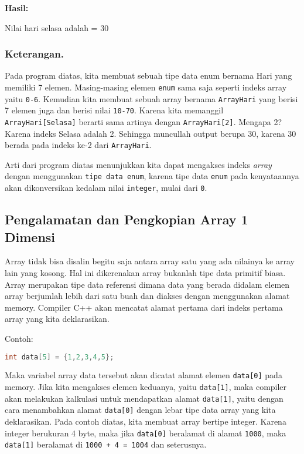 \textbf{Hasil:}

\begin{lcverbatim}
Nilai hari selasa adalah = 30
\end{lcverbatim}

\subsubsection*{Keterangan.}

Pada program diatas, kita membuat sebuah tipe data enum bernama Hari
yang memiliki 7 elemen. Masing-masing elemen \texttt{enum} sama saja
seperti indeks array yaitu \texttt{0-6}. Kemudian kita membuat sebuah
array bernama \texttt{ArrayHari} yang berisi 7 elemen juga dan berisi
nilai \texttt{10-70}. Karena kita memanggil \\
\texttt{ArrayHari{[}Selasa{]}} berarti sama artinya dengan
\texttt{ArrayHari{[}2{]}}. Mengapa 2? Karena indeks Selasa adalah 2.
Sehingga muncullah output berupa 30, karena 30 berada pada indeks ke-2
dari \texttt{ArrayHari}.

Arti dari program diatas menunjukkan kita dapat mengakses indeks
\emph{array} dengan menggunakan \texttt{tipe\ data\ enum}, karena tipe
data \texttt{enum} pada kenyataannya akan dikonversikan kedalam nilai
\texttt{integer}, mulai dari \texttt{0}.

\subsection{Pengalamatan dan Pengkopian Array 1 Dimensi}\label{pengalamatan-dan-pengkopian-array-1-dimensi}

Array tidak bisa disalin begitu saja antara array satu yang ada nilainya
ke array lain yang kosong. Hal ini dikerenakan array bukanlah tipe data
primitif biasa. Array merupakan tipe data referensi dimana data yang
berada didalam elemen array berjumlah lebih dari satu buah dan diakses
dengan menggunakan alamat memory. Compiler C++ akan mencatat alamat
pertama dari indeks pertama array yang kita deklarasikan.

Contoh:

\begin{lstlisting}[language=c++, numbers=none]
int data[5] = {1,2,3,4,5};
\end{lstlisting}

Maka variabel array data tersebut akan dicatat alamat elemen
\texttt{data{[}0{]}} pada memory. Jika kita mengakses elemen keduanya,
yaitu \texttt{data{[}1{]}}, maka compiler akan melakukan kalkulasi untuk
mendapatkan alamat \texttt{data{[}1{]}}, yaitu dengan cara menambahkan
alamat \texttt{data{[}0{]}} dengan lebar tipe data array yang kita
deklarasikan. Pada contoh diatas, kita membuat array bertipe integer.
Karena integer berukuran 4 byte, maka jika \texttt{data{[}0{]}}
beralamat di alamat \texttt{1000}, maka \texttt{data{[}1{]}} beralamat
di \texttt{1000\ +\ 4\ =\ 1004} dan seterusnya.

